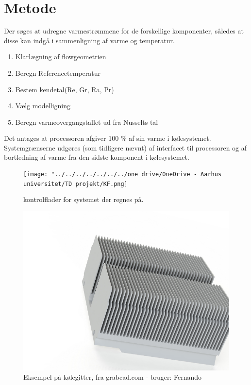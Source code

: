 \section{Metode}

Der søges at udregne varmestrømmene for de forskellige komponenter, således at disse kan indgå i sammenligning af varme og temperatur.

\begin{enumerate}
	\item Klarlægning af flowgeometrien
	\item Beregn Referencetemperatur
	\item Bestem kendetal(Re, Gr, Ra, Pr)
	\item Vælg modelligning
	\item Beregn varmeovergangstallet ud fra Nusselts tal
\end{enumerate}

Det antages at processoren afgiver 100 \% af sin varme i kølesystemet.
Systemgrænserne udgøres (som tidligere nævnt) af interfacet til processoren og af bortledning af varme fra den sidste komponent i kølesystemet.

\begin{figure}
	\centering
	\texttt{[image: "../../../../../../../one drive/OneDrive - Aarhus universitet/TD projekt/KF.png]}
	\caption{kontrolflader for systemet der regnes på.}
	\label{fig:kf}
\end{figure}

\begin{figure}
	\centering
	\includegraphics[width=0.7\linewidth]{billeder/heatsink1}
	\caption{Eksempel på kølegitter, fra grabcad.com - bruger: Fernando}
	\label{fig:heatsink1}
\end{figure}



